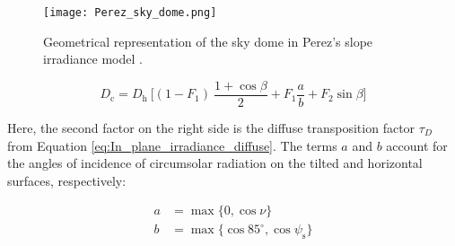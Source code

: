 \begin{figure}
    \centering
    \texttt{[image: Perez\_sky\_dome.png]}
    \caption{\small Geometrical representation of the sky dome in Perez's slope irradiance model \cite{Perez1986}.}
    \label{fig:Perez_sky_dome}
\end{figure}


\begin{equation}
    D_{\text{c}} = D_{\text{h}} \: \biggl[ (1-F_{1}) \: \frac{1 + \cos \beta}{2} + F_{1}\frac{a}{b} + F_{2} \sin\beta\biggr]
    \label{eq:Perez_in_plane_irradiance}
\end{equation}

\noindent
Here, the second factor on the right side is the diffuse transposition factor \(\tau_{D}\)
from Equation \ref{eq:In_plane_irradiance_diffuse}. The terms \(a\) and \(b\) account for the 
angles of incidence of circumsolar radiation on the tilted and horizontal surfaces, 
respectively:

\begin{align}
    a &= \max\{0, \cos\nu\} \\
    b &= \max\{\cos85^\circ, \cos \psi_{\text{s}}\}
\end{align}

